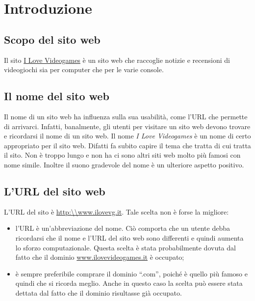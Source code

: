 \documentclass[../ProgettoTecWeb2.tex]{subfiles}
\begin{document}
\section{Introduzione}
	\subsection{Scopo del sito web}
	Il sito \href{http://ilovevg.it/}{I Love Videogames} è un sito web che raccoglie notizie e  recensioni di videogiochi sia per computer che per le varie console.

	\subsection{Il nome del sito web}
	Il nome di un sito web ha influenza sulla sua usabilità, come l'URL che permette di arrivarci. Infatti, banalmente, gli utenti per visitare un sito web devono trovare e ricordarsi il nome di un sito web. Il nome \textit{I Love Videogames} è un nome di certo appropriato per il sito web. Difatti fa subito capire il tema che tratta di cui tratta il sito. Non è troppo lungo e non ha ci sono altri siti web molto più famosi con nome simile. Inoltre il suono gradevole del nome è un ulteriore aspetto positivo.

	\subsection{L'URL del sito web}
	L'URL del sito è \url{http:\\www.ilovevg.it}. Tale scelta non è forse la migliore:
	\begin{itemize}
		\item l'URL è un'abbreviazione del nome. Ciò comporta che un utente debba ricordarsi che il nome e l'URL del sito web sono differenti e quindi aumenta lo sforzo computazionale. Questa scelta è stata probabilmente dovuta dal fatto che il dominio \url{www.ilovevideogames.it} è occupato;
		\item è sempre preferibile comprare il dominio ``.com'', poiché è quello più famoso e quindi che si ricorda meglio. Anche in questo caso la scelta può essere stata dettata dal fatto che il dominio risultasse già occupato.
	\end{itemize}
\end{document}
